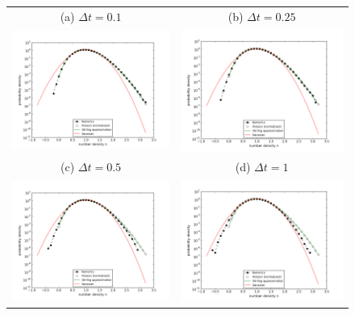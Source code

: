 \documentclass{article}
\begin{document}
\begin{figure}
\begin{center}
\end{center}
\begin{tabular}{cc}
(a) $\Delta t=0.1$ & (b) $\Delta t=0.25$ \\
\includegraphics[width=0.5\linewidth]{fig1/3d_DIFF_dt0.1_hist.png} &
\includegraphics[width=0.5\linewidth]{fig1/3d_DIFF_dt0.25_hist.png} \\
(c) $\Delta t=0.5$ & (d) $\Delta t=1$ \\
\includegraphics[width=0.5\linewidth]{fig1/3d_DIFF_dt0.5_hist.png} &
\includegraphics[width=0.5\linewidth]{fig1/3d_DIFF_dt1_hist.png} \\ 

\end{tabular}
\end{figure}
\end{document}
